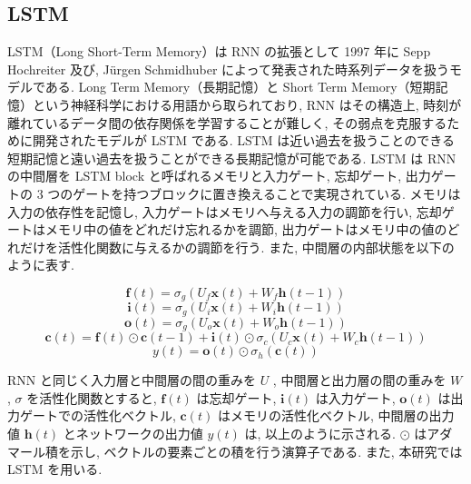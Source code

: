\subsection{LSTM}

LSTM（Long Short-Term Memory）は RNN の拡張として 1997 年に Sepp Hochreiter 及び, Jürgen Schmidhuber によって発表された時系列データを扱うモデルである\cite{sankou5}.
Long Term Memory（長期記憶）と Short Term Memory（短期記憶）という神経科学における用語から取られており,
RNN はその構造上, 時刻が離れているデータ間の依存関係を学習することが難しく, その弱点を克服するために開発されたモデルが LSTM である. 
LSTM は近い過去を扱うことのできる短期記憶と遠い過去を扱うことができる長期記憶が可能である. 
LSTM は RNN の中間層を LSTM block と呼ばれるメモリと入力ゲート, 忘却ゲート, 出力ゲートの 3 つのゲートを持つブロックに置き換えることで実現されている.
メモリは入力の依存性を記憶し, 入力ゲートはメモリへ与える入力の調節を行い, 忘却ゲートはメモリ中の値をどれだけ忘れるかを調節, 出力ゲートはメモリ中の値のどれだけを活性化関数に与えるかの調節を行う. 
また, 中間層の内部状態を以下のように表す.

\begin{equation}
 \bm{f}(t) = σ_g(U_f\bm{x}(t) + W_f\bm{h}(t-1))
\end{equation}
\begin{equation}
 \bm{i}(t) = σ_g(U_i\bm{x}(t) + W_i\bm{h}(t-1))
\end{equation}
\begin{equation}
 \bm{o}(t) = σ_g(U_o\bm{x}(t) + W_o\bm{h}(t-1))
\end{equation}
\begin{equation}
 \bm{c}(t) = \bm{f}(t) \odot \bm{c}(t-1) + \bm{i}(t) \odot σ_c(U_c\bm{x}(t) + W_c\bm{h}(t-1))
\end{equation}
\begin{equation}
 y(t) = \bm{o}(t) \odot σ_h(\bm{c}(t))
\end{equation}
\vspace{0mm}

RNN と同じく入力層と中間層の間の重みを $U$ ,
中間層と出力層の間の重みを $W$ ,
$σ$ を活性化関数とすると, $\bm{f}(t)$ は忘却ゲート, $\bm{i}(t)$ は入力ゲート, $\bm{o}(t)$ は出力ゲートでの活性化ベクトル, $\bm{c}(t)$ はメモリの活性化ベクトル,  
中間層の出力値 $\bm{h}(t)$ とネットワークの出力値 $y(t)$ は, 以上のように示される. $\odot$ はアダマール積を示し, ベクトルの要素ごとの積を行う演算子である. 
また, 本研究では LSTM を用いる.

